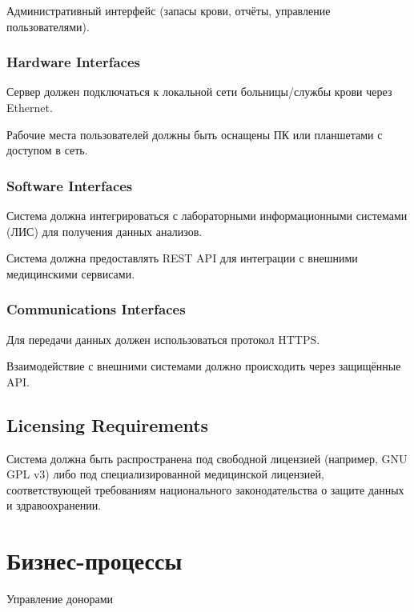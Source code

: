 \documentclass[a4paper,12pt]{article}
\begin{document}
Административный интерфейс (запасы крови, отчёты, управление пользователями).

\subsubsection*{Hardware Interfaces}

Сервер должен подключаться к локальной сети больницы/службы крови через Ethernet.

Рабочие места пользователей должны быть оснащены ПК или планшетами с доступом в сеть.

\subsubsection*{Software Interfaces}

Система должна интегрироваться с лабораторными информационными системами (ЛИС) для получения данных анализов.

Система должна предоставлять REST API для интеграции с внешними медицинскими сервисами.

\subsubsection*{Communications Interfaces}

Для передачи данных должен использоваться протокол HTTPS.

Взаимодействие с внешними системами должно происходить через защищённые API.

\subsection*{Licensing Requirements}

Система должна быть распространена под свободной лицензией (например, GNU GPL v3) либо под специализированной медицинской лицензией, соответствующей требованиям национального законодательства о защите данных и здравоохранении.




\section*{Бизнес-процессы}

Управление донорами
\end{document}
